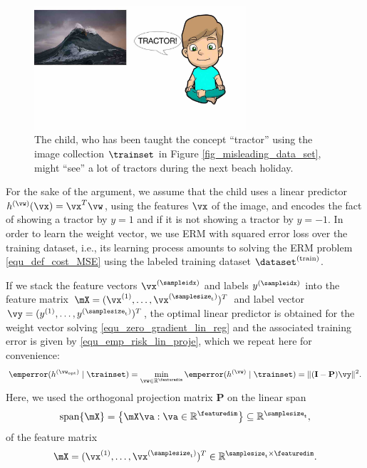\documentclass[12pt]{report}
\begin{document}
\begin{figure}[htbp]
	\centering
	\includegraphics[width=0.7\textwidth]{OverfittingSample.jpg}   
	\caption{The child, who has been taught the concept ``tractor'' using the image collection 
		$\trainset$ in Figure \ref{fig_misleading_data_set}, might ``see'' a lot of tractors during the next beach holiday.}
	\label{equ_wave_as_tractor}   
\end{figure}


For the sake of the argument, we assume that the child uses a linear predictor 
$h^{(\vw)}(\vx) = \vx^{T} \vw$, using the features $\vx$ of the image, and encodes 
the fact of showing a tractor by $y=1$ and if it is not showing a tractor by $y=-1$. 
In order to learn the weight vector, we use ERM with squared error loss over the 
training dataset, i.e., its learning process amounts to solving the ERM problem 
\eqref{equ_def_cost_MSE} using the labeled training dataset $ \dataset^{(\rm train)}$. 

If we stack the feature vectors $\vx^{(\sampleidx)}$ and labels $y^{(\sampleidx)}$ into 
the feature matrix $\mX=(\vx^{(1)},\ldots,\vx^{(\samplesize_{\rm t})})^{T}$ and label 
vector $\vy=(y^{(1)},\ldots,y^{(\samplesize_{\rm t})})^{T}$, the optimal linear predictor 
is obtained for the weight vector solving \eqref{equ_zero_gradient_lin_reg} 
and the associated training error is given by \eqref{equ_emp_risk_lin_proje}, which 
we repeat here for convenience: 
\begin{equation}
\emperror(h^{(\vw_{\rm opt})} \mid \trainset) = \min_{\vw \in \mathbb{R}^{\featuredim}} \emperror(h^{(\vw)} \mid \trainset) = \|  (\mathbf{I}- \mathbf{P}) \vy \|^{2}.
\end{equation} 
Here, we used the orthogonal projection matrix $\mathbf{P}$ on the linear span 
\begin{equation} 
\nonumber
{\rm span}\{ \mX \} = \big\{  \mX \va : \va \in \mathbb{R}^{\featuredim} \big\} \subseteq \mathbb{R}^{\samplesize_{\rm t}} , 
\end{equation}
of the feature matrix 
\begin{equation} 
\label{equ_feature_matrix_overfit}
\mX = (\vx^{(1)},\ldots,\vx^{(\samplesize_{\rm t})})^{T} \in \mathbb{R}^{  \samplesize_{\rm t} \times \featuredim}. 
\end{equation} 
\end{document}
